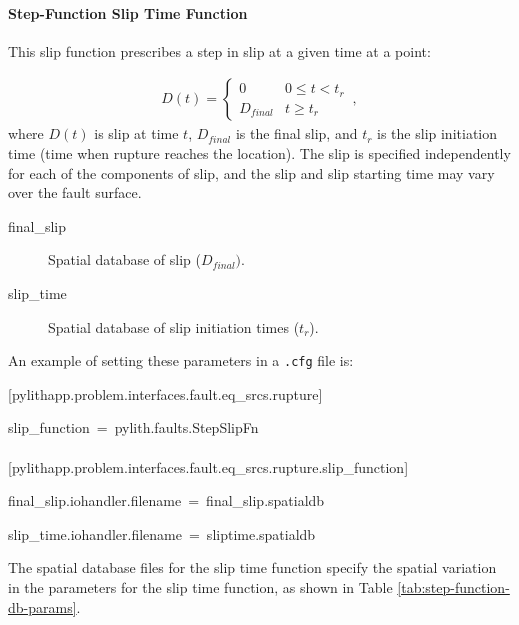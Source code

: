 \paragraph{Step-Function Slip Time Function}

This slip function prescribes a step in slip at a given time at a
point: 

\begin{gather}
D(t)=\left\{ \begin{array}{cc}
0 & 0\leq t<t_{r}\\
D_{final} & t\ge t_{r}
\end{array}\right.\,,
\end{gather}
where $D(t)$ is slip at time $t$, $D_{final}$ is the final slip,
and $t_{r}$ is the slip initiation time (time when rupture reaches
the location). The slip is specified independently for each of the
components of slip, and the slip and slip starting time may vary over
the fault surface.
\begin{description}
\item [{final\_slip}] Spatial database of slip ($D_{final})$.
\item [{slip\_time}] Spatial database of slip initiation times ($t_{r}$).
\end{description}
An example of setting these parameters in a \texttt{.cfg} file is:
\begin{lyxcode}
{[}pylithapp.problem.interfaces.fault.eq\_srcs.rupture{]}

slip\_function~=~pylith.faults.StepSlipFn~\\
~\\
{[}pylithapp.problem.interfaces.fault.eq\_srcs.rupture.slip\_function{]}

final\_slip.iohandler.filename~=~final\_slip.spatialdb

slip\_time.iohandler.filename~=~sliptime.spatialdb
\end{lyxcode}
The spatial database files for the slip time function specify the
spatial variation in the parameters for the slip time function, as
shown in Table \vref{tab:step-function-db-params}.

